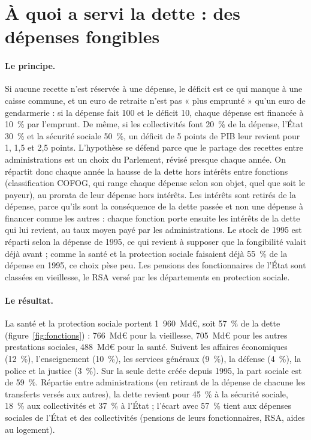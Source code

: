 \documentclass[11pt,a4paper]{article}
\begin{document}
\section{À quoi a servi la dette : des dépenses fongibles}\label{sec:fongible}

\paragraph{Le principe.} Si aucune recette n'est réservée à une dépense, le déficit est ce qui
manque à une caisse commune, et un euro de retraite n'est pas « plus emprunté » qu'un euro de
gendarmerie : si la dépense fait 100 et le déficit 10, chaque dépense est financée à 10~\% par
l'emprunt. De même, si les collectivités font 20~\% de la dépense, l'État 30~\% et la sécurité
sociale 50~\%, un déficit de 5 points de PIB leur revient pour 1, 1,5 et 2,5 points. L'hypothèse se défend parce que le partage des recettes entre administrations est un
choix du Parlement, révisé presque chaque année. On répartit donc chaque année la hausse de la dette
hors intérêts entre fonctions (classification COFOG, qui range chaque dépense selon son objet,
quel que soit le payeur), au prorata de leur dépense hors intérêts. Les intérêts sont retirés de la
dépense, parce qu'ils sont la conséquence de la dette passée et non une dépense à financer comme les
autres : chaque fonction porte ensuite les intérêts de la dette qui lui revient, au taux moyen payé
par les administrations. Le stock de 1995 est réparti selon la dépense de 1995, ce qui revient à
supposer que la fongibilité valait déjà avant ; comme la santé et la protection sociale faisaient
déjà 55~\% de la dépense en 1995, ce choix pèse peu. Les pensions des fonctionnaires de l'État sont
classées en vieillesse, le RSA versé par les départements en protection sociale.


\paragraph{Le résultat.} La santé et la protection sociale portent 1~960~Md€, soit 57~\% de la
dette (figure~\ref{fig:fonctions}) : 766~Md€ pour la vieillesse, 705~Md€ pour les autres
prestations sociales, 488~Md€ pour la santé. Suivent les affaires économiques (12~\%),
l'enseignement (10~\%), les services généraux (9~\%), la défense (4~\%), la police et la justice
(3~\%). Sur la seule dette créée depuis 1995, la part sociale est de 59~\%. Répartie entre
administrations (en retirant de la dépense de chacune les transferts versés aux autres), la dette
revient pour 45~\% à la sécurité sociale, 18~\% aux collectivités et 37~\% à l'État ; l'écart avec
57~\% tient aux dépenses sociales de l'État et des collectivités (pensions de leurs fonctionnaires,
RSA, aides au logement).
\end{document}
